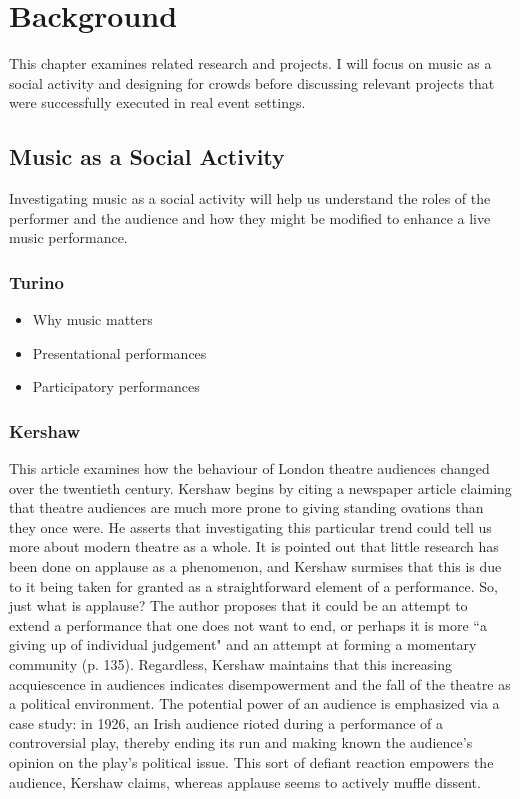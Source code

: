 \chapter{Background}

This chapter examines related research and projects. I will focus on music as a social activity and designing for crowds before discussing relevant projects that were successfully executed in real event settings.

\section{Music as a Social Activity}

Investigating music as a social activity will help us understand the roles of the performer and the audience and how they might be modified to enhance a live music performance.

\subsection{Turino}

\begin{itemize}
	\item Why music matters
	\item Presentational performances
	\item Participatory performances
\end{itemize}

\subsection{Kershaw}

This article examines how the behaviour of London theatre audiences changed over the twentieth century. Kershaw begins by citing a newspaper article claiming that theatre audiences are much more prone to giving standing ovations than they once were. He asserts that investigating this particular trend could tell us more about modern theatre as a whole. It is pointed out that little research has been done on applause as a phenomenon, and Kershaw surmises that this is due to it being taken for granted as a straightforward element of a performance. So, just what is applause? The author proposes that it could be an attempt to extend a performance that one does not want to end, or perhaps it is more ``a giving up of individual judgement" and an attempt at forming a momentary community (p. 135). Regardless, Kershaw maintains that this increasing acquiescence in audiences indicates disempowerment and the fall of the theatre as a political environment. The potential power of an audience is emphasized via a case study: in 1926, an Irish audience rioted during a performance of a controversial play, thereby ending its run and making known the audience's opinion on the play's political issue. This sort of defiant reaction empowers the audience, Kershaw claims, whereas applause seems to actively muffle dissent.

